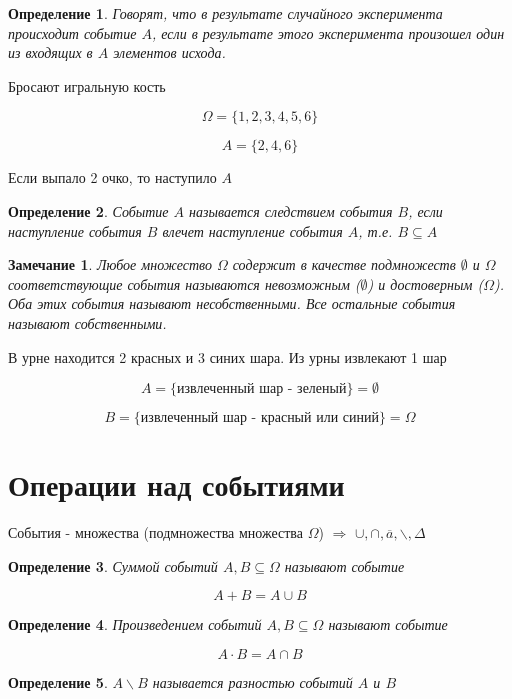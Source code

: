 \documentclass[a4paper, 14pt]{report}
\newtheorem{defenition}{Определение}[chapter]
\newtheorem{note}{Замечание}[chapter]
\begin{document}
\begin{defenition}
    Говорят, что в результате случайного эксперимента происходит событие $A$, если в результате этого эксперимента произошел один из входящих в $A$ элементов исхода.
\end{defenition}

Бросают игральную кость

$$
\Omega = \{ 1,2,3,4,5,6 \}
$$

$$
A = \{2,4,6\}
$$

Если выпало 2 очко, то наступило $A$

\begin{defenition}
    Событие $A$ называется следствием события $B$, если наступление события $B$ влечет наступление события $A$, т.е. $B \subseteq A$
\end{defenition}

\begin{note}
    Любое множество $\Omega$ содержит в качестве подмножеств $\emptyset$ и $\Omega$ соответствующие события называются невозможным ($\emptyset$) и достоверным ($\Omega$). Оба этих события называют несобственными. Все остальные события называют собственными.
\end{note}

В урне находится 2 красных и 3 синих шара. Из урны извлекают 1 шар

$$
A = \{ \text{извлеченный шар - зеленый} \} = \emptyset
$$

$$
B = \{ \text{извлеченный шар - красный или синий} \} = \Omega
$$

\section{Операции над событиями}

События - множества (подмножества множества $\Omega$) $\Rightarrow$ $\cup, \cap, \overline{a}, \backslash, \Delta$ 

\begin{defenition}
    Суммой событий $A,B \subseteq \Omega$ называют событие

    $$
    A + B = A \cup B
    $$
\end{defenition}

\begin{defenition}
    Произведением событий $A,B \subseteq \Omega$ называют событие

    $$
    A \cdot B = A \cap B
    $$
\end{defenition}

\begin{defenition}
    $A \backslash B$ называется разностью событий $A$ и $B$
\end{defenition}
\end{document}
